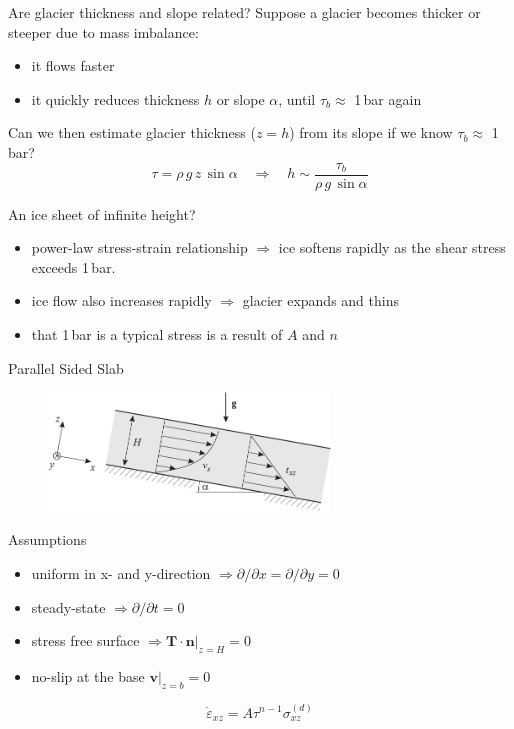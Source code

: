 \documentclass[hide notes,intlimits,unknownkeysallowed]{beamer}
\newcommand{\bn}{\mathbf{n}}
\newcommand{\bv}{\mathbf{v}}
\begin{document}
\begin{frame}{Are glacier thickness and slope related?}
  Suppose a glacier becomes thicker or steeper due to mass imbalance:
  \begin{itemize}
    \item it flows faster
    \item it quickly reduces thickness $h$ or slope $\alpha$, until $\tau_{b} \approx$ 1\,bar again
  \end{itemize}
  Can we then estimate glacier thickness ($z=h$) from its slope if we know $\tau_{b} \approx$ 1\,bar?
  \begin{displaymath}
    \tau = \rho\,g\,z\,\sin{\alpha} \quad \Rightarrow \quad h \sim \frac{\tau_{b}}{\rho\,g\,\sin{\alpha}}
  \end{displaymath}
\end{frame}


\begin{frame}{An ice sheet of infinite height?}
\begin{itemize}
  \item power-law stress-strain relationship $\Rightarrow$ ice softens
    rapidly as the shear stress exceeds 1\,bar.
  \item ice flow also increases rapidly $\Rightarrow$ glacier expands
    and thins
  \item that 1\,bar is a typical stress is a result of $A$ and $n$
\end{itemize}

\end{frame}


\begin{frame}{Parallel Sided Slab}
  \vspace{-1em}
  \begin{figure}
    \includegraphics[width=7.5cm]{figures/fig_3_11}
  \end{figure}
  \vspace{-1em}
  \begin{block}{Assumptions}
    \begin{itemize}
    \item uniform in x- and y-direction $\Rightarrow \partial / \partial x = \partial / \partial y = 0$
    \item steady-state $\Rightarrow \partial / \partial t = 0$
    \item stress free surface $\Rightarrow \mathbf{T}\cdot \bn \vert_{z=H} = 0$
    \item no-slip at the base $\bv \vert_{z=b} = 0$
    \end{itemize}
  \end{block}
  \vspace{.5em}
  \begin{equation*}
    \dot \varepsilon_{xz} = A\tau^{n-1} \sigma_{xz}^{(d)}
  \end{equation*}
\end{frame}
\end{document}
